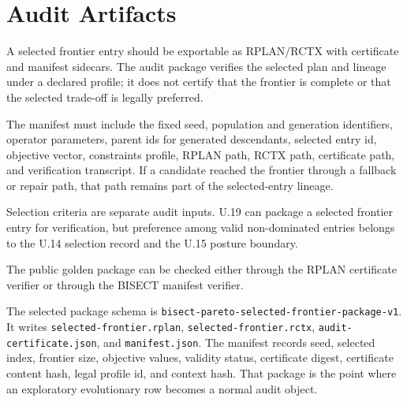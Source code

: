 \section{Audit Artifacts}

A selected frontier entry should be exportable as RPLAN/RCTX with certificate
and manifest sidecars. The audit package verifies the selected plan and lineage
under a declared profile; it does not certify that the frontier is complete or
that the selected trade-off is legally preferred.

The manifest must include the fixed seed, population and generation identifiers,
operator parameters, parent ids for generated descendants, selected entry id,
objective vector, constraints profile, RPLAN path, RCTX path, certificate path,
and verification transcript. If a candidate reached the frontier through a
fallback or repair path, that path remains part of the selected-entry lineage.

Selection criteria are separate audit inputs. U.19 can package a selected
frontier entry for verification, but preference among valid non-dominated
entries belongs to the U.14 selection record and the U.15 posture boundary.

The public golden package can be checked either through the RPLAN certificate
verifier or through the BISECT manifest verifier.

The selected package schema is
\texttt{bisect-pareto-selected-frontier-package-v1}. It writes
\texttt{selected-frontier.rplan}, \texttt{selected-frontier.rctx},
\texttt{audit-certificate.json}, and \texttt{manifest.json}. The manifest
records seed, selected index, frontier size, objective values, validity status,
certificate digest, certificate content hash, legal profile id, and context
hash. That package is the point where an exploratory evolutionary row becomes a
normal audit object.
